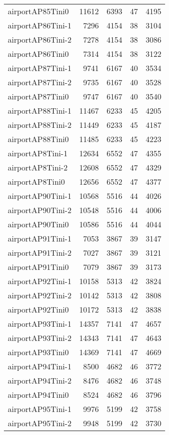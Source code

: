 \begin{longtable}{lrrrr}
airportAP85Tini0 & 11612 & 6393 & 47 & 4195 \\
airportAP86Tini-1 & 7296 & 4154 & 38 & 3104 \\
airportAP86Tini-2 & 7278 & 4154 & 38 & 3086 \\
airportAP86Tini0 & 7314 & 4154 & 38 & 3122 \\
airportAP87Tini-1 & 9741 & 6167 & 40 & 3534 \\
airportAP87Tini-2 & 9735 & 6167 & 40 & 3528 \\
airportAP87Tini0 & 9747 & 6167 & 40 & 3540 \\
airportAP88Tini-1 & 11467 & 6233 & 45 & 4205 \\
airportAP88Tini-2 & 11449 & 6233 & 45 & 4187 \\
airportAP88Tini0 & 11485 & 6233 & 45 & 4223 \\
airportAP8Tini-1 & 12634 & 6552 & 47 & 4355 \\
airportAP8Tini-2 & 12608 & 6552 & 47 & 4329 \\
airportAP8Tini0 & 12656 & 6552 & 47 & 4377 \\
airportAP90Tini-1 & 10568 & 5516 & 44 & 4026 \\
airportAP90Tini-2 & 10548 & 5516 & 44 & 4006 \\
airportAP90Tini0 & 10586 & 5516 & 44 & 4044 \\
airportAP91Tini-1 & 7053 & 3867 & 39 & 3147 \\
airportAP91Tini-2 & 7027 & 3867 & 39 & 3121 \\
airportAP91Tini0 & 7079 & 3867 & 39 & 3173 \\
airportAP92Tini-1 & 10158 & 5313 & 42 & 3824 \\
airportAP92Tini-2 & 10142 & 5313 & 42 & 3808 \\
airportAP92Tini0 & 10172 & 5313 & 42 & 3838 \\
airportAP93Tini-1 & 14357 & 7141 & 47 & 4657 \\
airportAP93Tini-2 & 14343 & 7141 & 47 & 4643 \\
airportAP93Tini0 & 14369 & 7141 & 47 & 4669 \\
airportAP94Tini-1 & 8500 & 4682 & 46 & 3772 \\
airportAP94Tini-2 & 8476 & 4682 & 46 & 3748 \\
airportAP94Tini0 & 8524 & 4682 & 46 & 3796 \\
airportAP95Tini-1 & 9976 & 5199 & 42 & 3758 \\
airportAP95Tini-2 & 9948 & 5199 & 42 & 3730 \\

\end{longtable}
